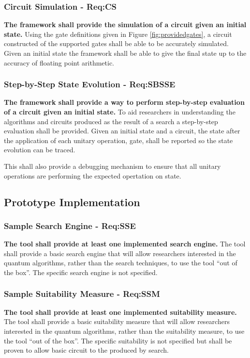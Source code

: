 \subsubsection{Circuit Simulation - Req:CS}
\label{sec:reqcs}
\textbf{The framework shall provide the simulation of a circuit given an initial state.}
Using the gate definitions given in Figure \ref{fig:providedgates}, a circuit constructed of the supported gates shall be able to be accurately simulated.
Given an initial state the framework shall be able to give the final state up to the accuracy of floating point arithmetic.

\subsubsection{Step-by-Step State Evolution - Req:SBSSE}
\label{sec:reqsbsse}
\textbf{The framework shall provide a way to perform step-by-step evaluation of a circuit given an initial state.}
To aid researchers in understanding the algorithms and circuits produced as the result of a search a step-by-step evaluation shall be provided.
Given an initial state and a circuit, the state after the application of each unitary operation, gate, shall be reported so the state evolution can be traced.

This shall also provide a debugging mechanism to ensure that all unitary operations are performing the expected opertation on state.

\subsection{Prototype Implementation}
\subsubsection{Sample Search Engine - Req:SSE}
\label{sec:reqsse}
\textbf{The tool shall provide at least one implemented search engine.}
The tool shall provide a basic search engine that will allow researchers interested in the quantum algorithms, rather than the search techniques, to use the tool ``out of the box''.
The specific search engine is not specified.

\subsubsection{Sample Suitability Measure - Req:SSM}
\label{sec:reqssm}
\textbf{The tool shall provide at least one implemented suitability measure.}
The tool shall provide a basic suitability measure that will allow researchers interested in the quantum algorithms, rather than the suitability measure, to use the tool ``out of the box''.
The specific suitability is not specified but shall be proven to allow basic circuit to the produced by search.

